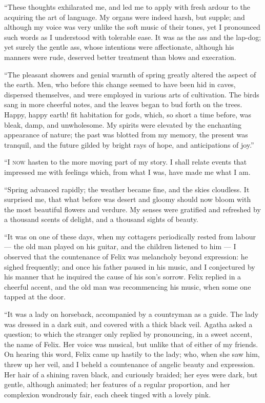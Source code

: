 ``These thoughts exhilarated me,
and led me to apply with fresh ardour
to the acquiring the art of language.
My organs were indeed harsh, but supple;
and although my voice was very
unlike the soft music of their tones,
yet I pronounced such words as I understood
with tolerable ease. It was
as the ass and the lap-dog; yet surely
the gentle ass, whose intentions were
affectionate, although his manners were
rude, deserved better treatment than
blows and execration.

``The pleasant showers and genial
warmth of spring gr\-eatly altered the
aspect of the earth. Men, who before
this change seemed to have been hid
in caves, dispersed themselves, and
were employed in various arts of cultivation.
The birds sang in more
cheerful notes, and the leaves began to bud
forth on the trees. Happy, happy
earth! fit habitation for gods, which,
so short a time before, was bleak, damp,
and unwholesome. My spirits were
elevated by the enchanting appearance
of nature; the past was blotted from
my memory, the present was tranquil,
and the future gilded by bright rays
of hope, and anticipations of joy.''


``\textsc{I now} hasten to the more moving
part of my story. I shall relate events
that impressed me with feelings which,
from what I was, have made me what
I am.

``Spring advanced rapidly; the weather
became fine, and the skies cloudless.
It surprised me, that what before
was desert and gloomy should now
bloom with the most beautiful flowers
and verdure. My senses were gratified
and refreshed by a thousand scents of
delight, and a thousand sights of
beauty.

``It was on one of these days, when
my cottagers periodically rested from
labour --- the old man played on his
guitar, and the children listened to
him --- I observed that the countenance
of Felix was melancholy beyond expression:
he sighed frequently; and once
his father paused in his music, and I
conjectured by his manner that he inquired
the cause of his son's sorrow.
Felix replied in a cheerful accent, and
the old man was recommencing his
music, when some one tapped at the
door.

``It was a lady on horseback, accompanied
by a countryman as a guide.
The lady was dressed in a dark suit, and
covered with a thick black veil. Agatha
asked a question; to which the
stranger only replied by pronouncing, in a
sweet accent, the name of Felix. Her
voice was musical, but unlike that of
either of my friends. On hearing this
word, Felix came up hastily to the lady;
who, when she saw him, threw up her
veil, and I beheld a countenance of angelic
beauty and expression. Her hair
of a shining raven black, and curiously
braided; her eyes were dark, but gentle,
although animated; her features of a
regular proportion, and her complexion
wondrously fair, each cheek tinged
with a lovely pink.

